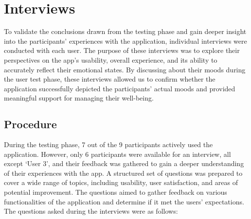 \section{Interviews}

To validate the conclusions drawn from the testing phase and gain deeper insight into the participants’ experiences with the application, individual interviews were conducted with each user. The purpose of these interviews was to explore their perspectives on the app's usability, overall experience, and its ability to accurately reflect their emotional states. By discussing about their moods during the user test phase, these interviews allowed us to confirm whether the application successfully depicted the participants’ actual moods and provided meaningful support for managing their well-being.

\subsection{Procedure}

During the testing phase, 7 out of the 9 participants actively used the application. However, only 6 participants were available for an interview, all except `User 3', and their feedback was gathered to gain a deeper understanding of their experiences with the app. A structured set of questions was prepared to cover a wide range of topics, including usability, user satisfaction, and areas of potential improvement. The questions aimed to gather feedback on various functionalities of the application and determine if it met the users' expectations. The questions asked during the interviews were as follows:

